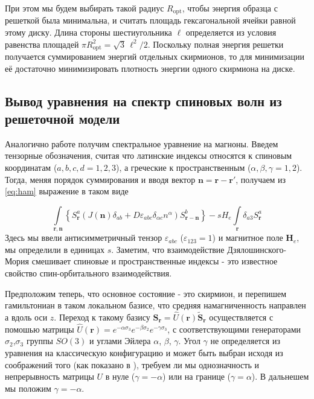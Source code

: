 \documentclass[a4paper,article,14pt]{extarticle}
\begin{document}
При этом мы будем выбирать такой радиус $R_\text{opt}$, чтобы энергия образца с решеткой была минимальна,\cite{bogdanov, nagaosaHan} и считать площадь гексагональной ячейки равной этому диску. Длина стороны шестиугольника $\ell$ определяется из условия равенства площадей $\pi R_\text{opt}^{2} = \sqrt{3}\,\ell^{2}/2$. Поскольку полная энергия решетки получается суммированием энергий отдельных скирмионов, то для минимизации её  достаточно минимизировать плотность энергии одного скирмиона на диске.



\subsection{Вывод уравнения на спектр спиновых волн из решеточной модели}
Аналогично работе \cite{aristov1} получим спектральное уравнение на магноны. Введем тензорные обозначения, считая что латинские индексы относятся к спиновым координатам ($a,b,c,d = 1,2,3$), а греческие к пространственным ($\alpha, \beta, \gamma = 1,2$). Тогда, меняя порядок суммирования и вводя вектор $\mathbf{n}=\mathbf{r} - \mathbf{r}'$, получаем из \eqref{eq:ham} выражение в таком виде

\begin{equation}
\label{eq:mainHam}
\int\limits_{{\mathbf{r}},{\mathbf{n}}} {\left\{ { S_{\mathbf{r}}^a\left( {J\left( {\mathbf{n}} \right){\delta _{ab}} + D{\varepsilon _{abc}}{\delta _{\alpha c}}{n^\alpha }} \right) S_{{\mathbf{r}} - {\mathbf{n}}}^b} \right\}}  - s H_e \int\limits_{\mathbf{r}} { \delta _{a3}  S_{\mathbf{r}}^a }
\end{equation}
Здесь мы ввели антисимметричный тензор $\varepsilon_{abc}$ ($\varepsilon_{123} = 1$) и магнитное поле $\mathbf{H}_e$, мы определили в единицах $s$. Заметим, что взаимодействие Дзялошинского-Мория смешивает спиновые и пространственные индексы - это известное свойство спин-орбитального взаимодействия.

Предположим теперь, что основное состояние - это скирмион, и перепишем гамильтониан в таком локальном базисе, что средняя намагниченность направлен	а вдоль оси $z$.
Переход к такому базису ${\mathbf{S}}_{\mathbf{r}} = \hat U\left( \mathbf{r} \right)\tilde { \mathbf{S}}_{\mathbf{r}}$ осуществляется с помошью матрицы $\hat U(\mathbf{r}) = e^{-\alpha \sigma_3}e^{-\beta \sigma_2}e^{-\gamma \sigma_3}$, с соответствующими генераторами $\sigma_2$,$\sigma_3$ группы $SO(3)$ и углами Эйлера $\alpha$, $\beta$, $\gamma$. Угол $\gamma$ не определяется из уравнения на классическую конфигурацию и может быть выбран исходя из соображений того (как показано в \cite{aristov1}), требуем ли мы однозначность и непрерывность матрицы $U$ в нуле ($\gamma = -\alpha$) или на границе ($\gamma = \alpha$). В дальнешем мы положим  $\gamma = -\alpha$.
\end{document}
